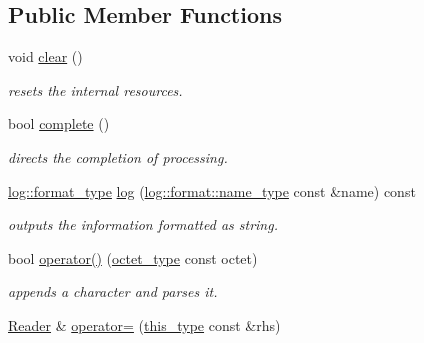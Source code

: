\subsection*{Public Member Functions}
\begin{DoxyCompactItemize}
\item 
\hypertarget{classhryky_1_1ip_1_1v4_1_1_reader_aed3b4f15d5dfa95de024379dd2f6feca}{void \hyperlink{classhryky_1_1ip_1_1v4_1_1_reader_aed3b4f15d5dfa95de024379dd2f6feca}{clear} ()}\label{classhryky_1_1ip_1_1v4_1_1_reader_aed3b4f15d5dfa95de024379dd2f6feca}

\begin{DoxyCompactList}\small\item\em resets the internal resources. \end{DoxyCompactList}\item 
\hypertarget{classhryky_1_1ip_1_1v4_1_1_reader_a1dae2806afe589da9e80771968c093f4}{bool \hyperlink{classhryky_1_1ip_1_1v4_1_1_reader_a1dae2806afe589da9e80771968c093f4}{complete} ()}\label{classhryky_1_1ip_1_1v4_1_1_reader_a1dae2806afe589da9e80771968c093f4}

\begin{DoxyCompactList}\small\item\em directs the completion of processing. \end{DoxyCompactList}\item 
\hypertarget{classhryky_1_1ip_1_1v4_1_1_reader_ac72d8975a80c002fd0b477596721f9dd}{\hyperlink{namespacehryky_1_1log_ad50448c3f934f1eacd5c1bcffe8111e1}{log\-::format\-\_\-type} \hyperlink{classhryky_1_1ip_1_1v4_1_1_reader_ac72d8975a80c002fd0b477596721f9dd}{log} (\hyperlink{namespacehryky_1_1log_1_1format_ab7408d1e2ed2d648dbf9bba69eb74288}{log\-::format\-::name\-\_\-type} const \&name) const }\label{classhryky_1_1ip_1_1v4_1_1_reader_ac72d8975a80c002fd0b477596721f9dd}

\begin{DoxyCompactList}\small\item\em outputs the information formatted as string. \end{DoxyCompactList}\item 
\hypertarget{classhryky_1_1ip_1_1v4_1_1_reader_ae794da1ea3029cf7fd66e403795403fb}{bool \hyperlink{classhryky_1_1ip_1_1v4_1_1_reader_ae794da1ea3029cf7fd66e403795403fb}{operator()} (\hyperlink{namespacehryky_a488cba8b666be33ccca70e819684e3c8}{octet\-\_\-type} const octet)}\label{classhryky_1_1ip_1_1v4_1_1_reader_ae794da1ea3029cf7fd66e403795403fb}

\begin{DoxyCompactList}\small\item\em appends a character and parses it. \end{DoxyCompactList}\item 
\hypertarget{classhryky_1_1ip_1_1v4_1_1_reader_a46129713d0a9155a67be61bfdf882e96}{\hyperlink{classhryky_1_1ip_1_1v4_1_1_reader}{Reader} \& \hyperlink{classhryky_1_1ip_1_1v4_1_1_reader_a46129713d0a9155a67be61bfdf882e96}{operator=} (\hyperlink{classhryky_1_1ip_1_1v4_1_1_reader_a007590474d740ed246e201fe227b618f}{this\-\_\-type} const \&rhs)}\label{classhryky_1_1ip_1_1v4_1_1_reader_a46129713d0a9155a67be61bfdf882e96}


\end{DoxyCompactItemize}
